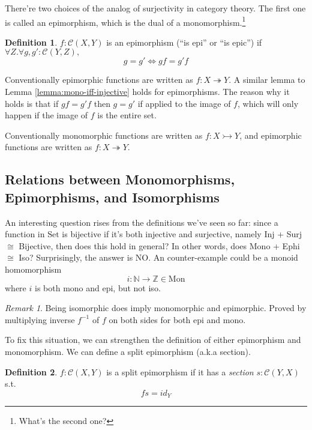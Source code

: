 \documentclass[12pt]{article}
\theoremstyle{plain}
\theoremstyle{definition}
\newtheorem{definition}{Definition}
\theoremstyle{remark}
\newtheorem*{remark}{Remark}
\newcommand{\cat}[1]{\mathcal{#1}}
\newcommand{\Set}{\mathrm{Set}}
\begin{document}
There're two choices of the analog of surjectivity in category theory. The first one is called an epimorphism, which is the dual of a monomorphism.\footnote{What's the second one?}

\begin{definition}
  $f: \cat{C}(X, Y)$ is an epimorphism (``is epi'' or ``is epic'') if $\forall Z. \forall g, g' : \cat{C}(Y, Z),$ $$g = g' \iff g f = g' f$$
\end{definition}

Conventionally epimorphic functions are written as $f : X \twoheadrightarrow Y$.
A similar lemma to Lemma \ref{lemma:mono-iff-injective} holds for epimorphisms. The reason why it holds is that if $g f = g' f$ then $g = g'$ if applied to the image of $f$, which will only happen if the image of $f$ is the entire set.


Conventionally monomorphic functions are written as $f : X \rightarrowtail Y$, and epimorphic functions are written as $f : X \twoheadrightarrow Y$.


\subsection{Relations between Monomorphisms, Epimorphisms, and Isomorphisms}

An interesting question rises from the definitions we've seen so far: since a function in $\Set$ is bijective if it's both injective and surjective, namely Inj + Surj $\cong$ Bijective, then does this hold in general? In other words, does Mono + Ephi $\cong$ Iso? Surprisingly, the answer is NO. An counter-example could be a monoid homomorphism
$$
i : \mathbb{N} \rightarrow \mathbb{Z} \in \text{Mon}
$$
where $i$ is both mono and epi, but not iso.

\begin{remark}
  Being isomorphic does imply monomorphic and epimorphic. Proved by multiplying inverse $f^{-1}$ of $f$ on both sides for both epi and mono.
\end{remark}

To fix this situation, we can strengthen the definition of either epimorphism and monomorphism. We can define a split epimorphism (a.k.a section).

\begin{definition}
  $f: \cat{C}(X, Y)$ is a split epimorphism if it has a \emph{section} $s: \cat{C}(Y, X)$ s.t. $$f s = id_Y$$
\end{definition}
\end{document}
